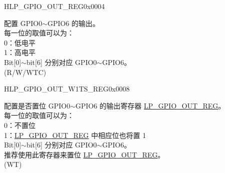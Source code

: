 \begin{register}{H}{LP\_GPIO\_OUT\_REG}{0x0004}\label{regdesc:LPGPIOOUTREG}
%
%
\regnewline%
\begin{regdesc}\begin{reglist}
\label{fielddesc:LPGPIOOUTDATAORIG}\item [LP\_GPIO\_OUT\_DATA\_ORIG] 配置 GPIO0$\sim$GPIO6 的输出。\\
每一位的取值可以为：\\
0：低电平\\
1：高电平\\
Bit[0]$\sim$bit[6] 分别对应 GPIO0$\sim$GPIO6。\\ (R/W/WTC)
\end{reglist}\end{regdesc}
\end{register}


\begin{register}{H}{LP\_GPIO\_OUT\_W1TS\_REG}{0x0008}\label{regdesc:LPGPIOOUTW1TSREG}
%
%
\regnewline%
\begin{regdesc}\begin{reglist}
\label{fielddesc:LPGPIOOUTW1TS}\item [LP\_GPIO\_OUT\_W1TS] 配置是否置位 GPIO0$\sim$GPIO6 的输出寄存器 \hyperref[regdesc:LPGPIOOUTREG]{LP\_GPIO\_OUT\_REG}。\\
每一位的取值可以为：\\
0：不置位\\
1：\hyperref[regdesc:LPGPIOOUTREG]{LP\_GPIO\_OUT\_REG} 中相应位也将置 1\\
Bit[0]$\sim$bit[6] 分别对应 GPIO0$\sim$GPIO6。\\
推荐使用此寄存器来置位 \hyperref[regdesc:LPGPIOOUTREG]{LP\_GPIO\_OUT\_REG}。 \\
(WT)
\end{reglist}\end{regdesc}
\end{register}


